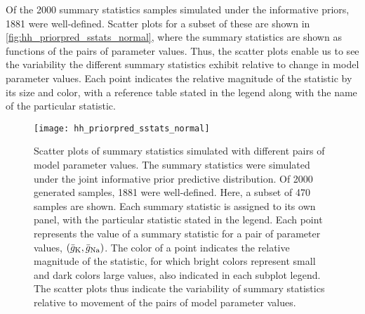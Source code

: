 Of the 2000 summary statistics samples simulated under the informative priors, 1881 were well-defined. Scatter plots for a subset of these are shown in \autoref{fig:hh_priorpred_sstats_normal}, where the summary statistics are shown as functions of the pairs of parameter values. Thus, the scatter plots enable us to see the variability the different summary statistics exhibit relative to change in model parameter values. Each point indicates the relative magnitude of the statistic by its size and color, with a reference table stated in the legend along with the name of the particular statistic.
\begin{figure}[H]
    \centering
    \texttt{[image: hh\_priorpred\_sstats\_normal]}
    \caption{Scatter plots of summary statistics simulated with different pairs of model parameter values. The summary statistics were simulated under the joint informative prior predictive distribution. Of 2000 generated samples, 1881 were well-defined. Here, a subset of 470 samples are shown. Each summary statistic is assigned to its own panel, with the particular statistic stated in the legend. Each point represents the value of a summary statistic for a pair of parameter values, $\qty(\bar{g}_{\mathrm{K}}, \bar{g}_{\mathrm{Na}})$. The color of a point indicates the relative magnitude of the statistic, for which bright colors represent small and dark colors large values, also indicated in each subplot legend. The scatter plots thus indicate the variability of summary statistics relative to movement of the pairs of model parameter values.
    }
    \label{fig:hh_priorpred_sstats_normal}
\end{figure} 
